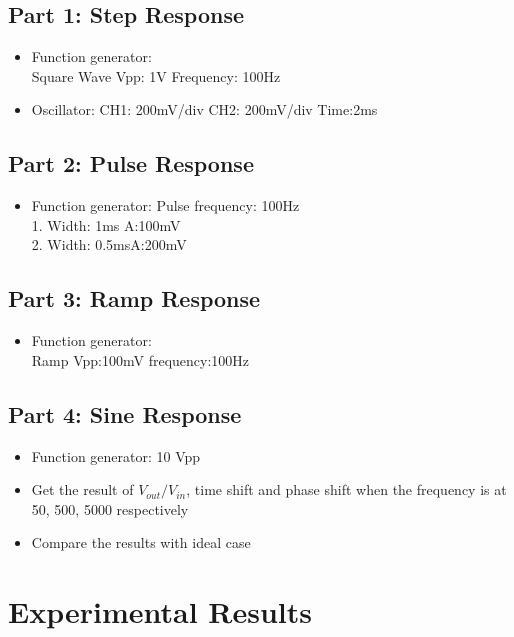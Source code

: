\documentclass[12pt]{article}
\begin{document}
\subsection{Part 1: Step Response} 
\begin{itemize}
\item Function generator:
\\Square Wave \qquad Vpp: 1V \qquad Frequency: 100Hz
\item Oscillator:
CH1: 200mV/div \qquad CH2: 200mV/div \qquad Time:2ms
\end{itemize}
\subsection{Part 2: Pulse Response}
\begin{itemize}
\item Function generator: Pulse frequency: 100Hz
\\1. Width: 1ms \qquad  A:100mV
\\2. Width: 0.5ms\qquad A:200mV
\end{itemize}
\subsection{Part 3: Ramp Response}
\begin{itemize}
\item Function generator:
\\Ramp \qquad Vpp:100mV \qquad frequency:100Hz
\end{itemize}
\subsection{Part 4: Sine Response}
\begin{itemize}
\item Function generator: 10 Vpp
\item Get the result of $V_{out}/V_{in}$, time shift and phase shift when the frequency is at 50, 500, 5000 respectively
\item Compare the results with ideal case
\end{itemize}
\section{Experimental Results}
\end{document}
